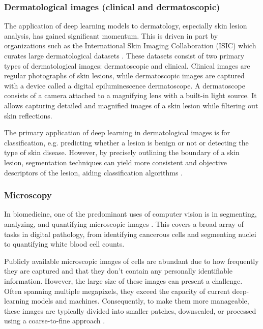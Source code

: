 \subsubsection{Dermatological images (clinical and dermatoscopic)}

The application of deep learning models to dermatology, especially skin lesion analysis, has gained significant momentum. This is driven in part by organizations such as the International Skin Imaging Collaboration (ISIC) which curates large dermatological datasets \cite{rotembergPatientcentricDatasetImages2021}. These datasets consist of two primary types of dermatological images: dermatoscopic and clinical. Clinical images are regular photographs of skin lesions, while dermatoscopic images are captured with a device called a digital epiluminescence dermatoscope. A dermatoscope consists of a camera attached to a magnifying lens with a built-in light source. It allows capturing detailed and magnified images of a skin lesion while filtering out skin reflections.

The primary application of deep learning in dermatological images is for classification, e.g. predicting whether a lesion is benign or not or detecting the type of skin disease. However, by precisely outlining the boundary of a skin lesion, segmentation techniques can yield more consistent and objective descriptors of the lesion, aiding classification algorithms \cite{rotembergPatientcentricDatasetImages2021}.

\subsubsection{Microscopy}

In biomedicine, one of the predominant uses of computer vision is in segmenting, analyzing, and quantifying microscopic images \cite{khanAutoCellSegRobustAutomatic2018}. This covers a broad array of tasks in digital pathology, from identifying cancerous cells and segmenting nuclei to quantifying white blood cell counts.

Publicly available microscopic images of cells are abundant due to how frequently they are captured and that they don't contain any personally identifiable information. However, the large size of these images can present a challenge. Often spanning multiple megapixels, they exceed the capacity of current deep-learning models and machines. Consequently, to make them more manageable, these images are typically divided into smaller patches, downscaled, or processed using a coarse-to-fine approach \cite{jhaInstanceSegmentationWhole2021a}.

